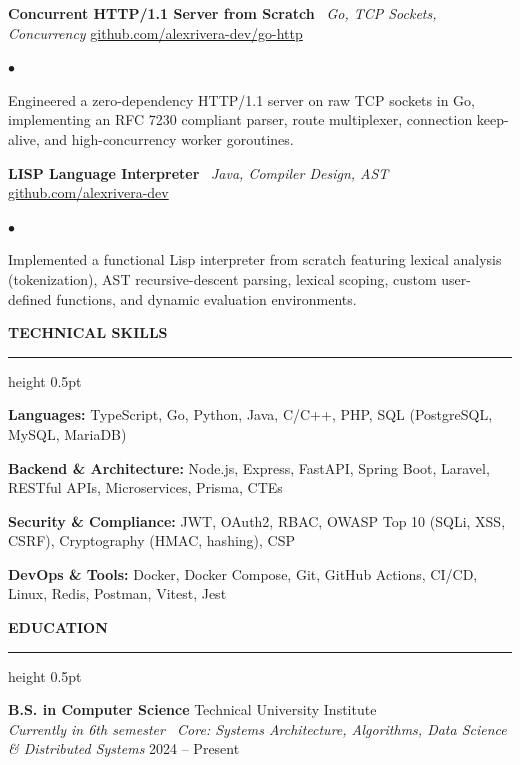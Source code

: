 \documentclass[10pt,letterpaper]{article}
\newcommand{\resumesection}[1]{%
  \vspace{2pt}%
  {\color{primary}\normalsize\bfseries\MakeUppercase{#1}}%
  \vspace{1pt}\hrule height 0.5pt\vspace{2pt}%
}
\renewenvironment{itemize}{%
  \begin{list}{\color{primary}$\bullet$}{%
    \setlength{\leftmargin}{1.1em}%
    \setlength{\itemsep}{0.5pt}%
    \setlength{\topsep}{1pt}%
    \setlength{\parsep}{0pt}%
    \setlength{\partopsep}{0pt}%
  }%
}{%
  \end{list}%
}
\newenvironment{skilllist}{%
  \begin{list}{}{%
    \setlength{\leftmargin}{0pt}%
    \setlength{\itemsep}{0.5pt}%
    \setlength{\topsep}{1pt}%
    \setlength{\parsep}{0pt}%
    \setlength{\partopsep}{0pt}%
  }%
}{%
  \end{list}%
}
\begin{document}
\vspace{1pt}

\textbf{Concurrent HTTP/1.1 Server from Scratch} \textbar\ \textit{Go, TCP Sockets, Concurrency} \hfill \href{https://github.com/alexrivera-dev/go-http}{github.com/alexrivera-dev/go-http}
\begin{itemize}
    \item Engineered a zero-dependency HTTP/1.1 server on raw TCP sockets in Go, implementing an RFC 7230 compliant parser, route multiplexer, connection keep-alive, and high-concurrency worker goroutines.
\end{itemize}

\vspace{1pt}

\textbf{LISP Language Interpreter} \textbar\ \textit{Java, Compiler Design, AST} \hfill \href{https://github.com/alexrivera-dev}{github.com/alexrivera-dev}
\begin{itemize}
    \item Implemented a functional Lisp interpreter from scratch featuring lexical analysis (tokenization), AST recursive-descent parsing, lexical scoping, custom user-defined functions, and dynamic evaluation environments.
\end{itemize}

\resumesection{Technical Skills}
\begin{skilllist}
    \item \textbf{Languages:} TypeScript, Go, Python, Java, C/C++, PHP, SQL (PostgreSQL, MySQL, MariaDB)
    \item \textbf{Backend \& Architecture:} Node.js, Express, FastAPI, Spring Boot, Laravel, RESTful APIs, Microservices, Prisma, CTEs
    \item \textbf{Security \& Compliance:} JWT, OAuth2, RBAC, OWASP Top 10 (SQLi, XSS, CSRF), Cryptography (HMAC, hashing), CSP
    \item \textbf{DevOps \& Tools:} Docker, Docker Compose, Git, GitHub Actions, CI/CD, Linux, Redis, Postman, Vitest, Jest
\end{skilllist}

\resumesection{Education}
\textbf{B.S. in Computer Science} \hfill Technical University Institute \\
\textit{Currently in 6th semester \textbar\ Core: Systems Architecture, Algorithms, Data Science \& Distributed Systems} \hfill 2024 -- Present
\end{document}
